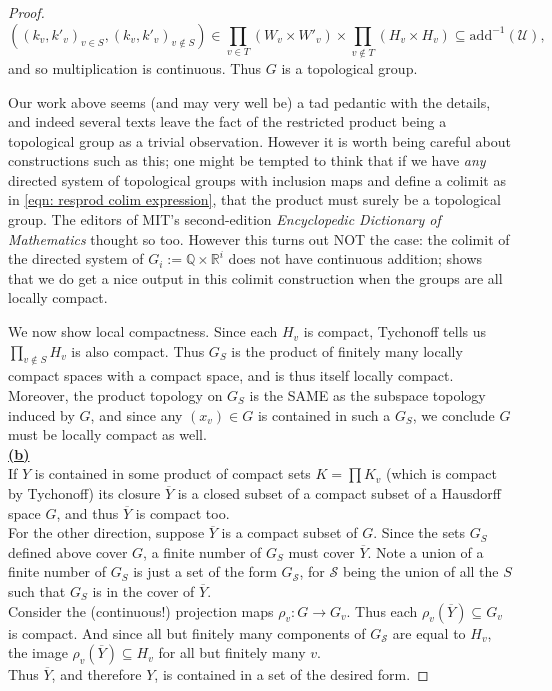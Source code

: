 \documentclass[11pt, x11names, openany]{book}
\newcommand{\qq}{\mathbb{Q}}
\newcommand{\rr}{\mathbb{R}}
\newcommand{\calu}{\mathcal{U}}
\newcommand{\fans}{\mathscr{S}}
\renewcommand{\bar}[1]{\overline{#1}}
\renewcommand{\brack}[1]{\left(   #1 \right)}
\newcommand{\inv}[1]{#1^{-1}}
\begin{document}
\begin{proof}
\begin{equation*}
    \brack{ \brack{k_v, k'_v}_{v \in S}, \brack{k_v, k'_v}_{v \notin S}}  \in \prod_{v \in T} \brack{W_v \times W'_v} \times \prod_{v \notin T} \brack{H_v \times H_v} \subseteq \inv{\text{add}}(\calu),  
\end{equation*}
and so multiplication is continuous. Thus $G$ is a topological group.
\begin{warning}
    Our work above seems (and may very well be) a tad pedantic with the details, and indeed several texts leave the fact of the restricted product being a topological group as a trivial observation. However it is worth being careful about constructions such as this; one might be tempted to think that if we have \textit{any} directed system of topological groups with inclusion maps and define a colimit as in \ref{eqn: resprod colim expression}, that the product must surely be a topological group. The editors of MIT's second-edition \textit{Encyclopedic Dictionary of Mathematics} thought so too. However this turns out NOT the case: the colimit of the directed system of $G_i := \qq \times \rr^i$ does not have continuous addition; \cite{Shimomura-topgrp-colimit} shows that we do get a nice output in this colimit construction when the groups are all locally compact.
\end{warning}
We now show local compactness. Since each $H_v$ is compact, Tychonoff tells us $\prod_{v \notin S} H_v$ is also compact. Thus $G_S$ is the product of finitely many locally compact spaces with a compact space, and is thus itself locally compact. Moreover, the product topology on $G_S$ is the SAME as the subspace topology induced by $G$, and since any $(x_v) \in G$ is contained in such a $G_S$, we conclude $G$ must be locally compact as well.\\

\textbf{\underline{(b)}}\\
If $Y$ is contained in some product of compact sets $ K = \prod K_v$ (which is compact by Tychonoff) its closure $\bar{Y}$ is a closed subset of a compact subset of a Hausdorff space $G$, and thus $\bar{Y}$ is compact too.\\
For the other direction, suppose $\bar{Y}$ is a compact subset of $G$. Since the sets $G_S$ defined above cover $G$, a finite number of $G_S$ must cover $\bar{Y}$. Note a union of a finite number of $G_S$ is just a set of the form $G_{\fans}$, for $\fans$ being the union of all the $S$ such that $G_S$ is in the cover of $\bar{Y}$.\\
Consider the (continuous!) projection maps $\rho_v: G \to G_v$. Thus each $\rho_v(\bar{Y}) \subseteq G_v$ is compact. And since all but finitely many components of $G_{\fans}$ are equal to $H_v$, the image $\rho_v(\bar{Y}) \subseteq H_v$ for all but finitely many $v$.\\
Thus $\bar{Y}$, and therefore $Y$, is contained in a set of the desired form.
\end{proof}
\end{document}
